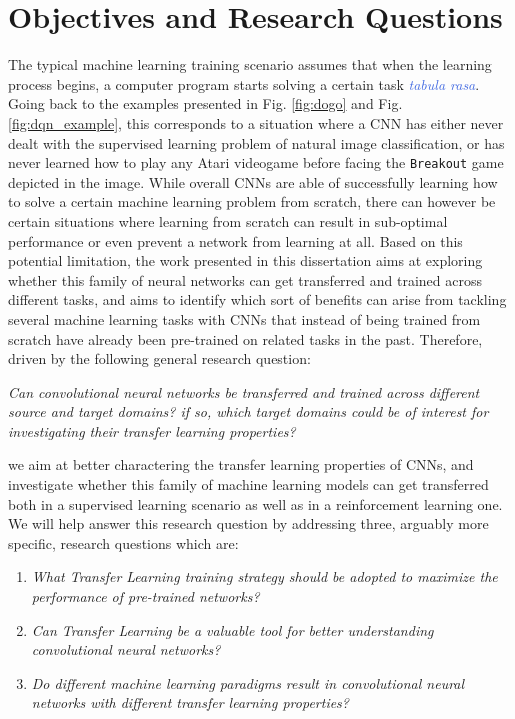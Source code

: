 \section*{Objectives and Research Questions}

The typical machine learning training scenario assumes that when the learning process begins, a computer program starts solving a certain task \textcolor{RoyalBlue}{\textit{tabula rasa}}. Going back to the examples presented in Fig. \ref{fig:dogo} and Fig. \ref{fig:dqn_example}, this corresponds to a situation where a CNN has either never dealt with the supervised learning problem of natural image classification, or has never learned how to play any Atari videogame before facing the \texttt{Breakout} game depicted in the image. While overall CNNs are able of successfully learning how to solve a certain machine learning problem from scratch, there can however be certain situations
where learning from scratch can result in sub-optimal performance or even prevent a network from  learning at all. Based on this potential limitation, the work presented in this dissertation aims at exploring whether this family of neural networks can get transferred and trained across different tasks, and aims to identify which sort of benefits can arise from tackling several machine learning tasks with CNNs that instead of being trained from scratch have already been pre-trained on related tasks in the past. Therefore, driven by the following general research question:
\begin{center}
	\textit{Can convolutional neural networks be transferred and trained across different source and target domains? if so, which target domains could be of interest for investigating their transfer learning properties?}	
\end{center}    
we aim at better charactering the transfer learning properties of CNNs, and investigate whether this family of machine learning models can get transferred both in a supervised learning scenario as well as in a reinforcement learning one. We will help answer this research question by addressing three, arguably more specific, research questions which are:
\begin{enumerate}
	\item \textit{What Transfer Learning training strategy should be adopted to maximize the performance of pre-trained networks?}

	\item \textit{Can Transfer Learning be a valuable tool for better understanding convolutional neural networks?}
	
	\item \textit{Do different machine learning paradigms result in convolutional neural networks with different transfer learning properties?}
\end{enumerate}


